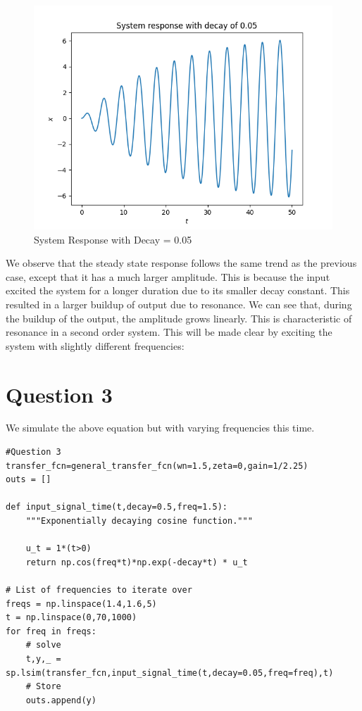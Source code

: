 \documentclass{article}
\begin{document}
\begin{figure}[tbh!]
\centering
\includegraphics[scale=0.6]{plots/System response with decay of 0.05.png}
\caption{System Response with Decay = 0.05}
\label{fig:System Response with Decay = 0.05}
\end{figure}
\newpage
We observe that the steady state response follows the same trend as the
previous case, except that it has a much larger amplitude. This is
because the input excited the system for a longer duration due to its
smaller decay constant. This resulted in a larger buildup of output due
to resonance. We can see that, during the buildup of the output, the
amplitude grows linearly. This is characteristic of resonance in a
second order system. This will be made clear by exciting the system with
slightly different frequencies:


\section*{Question 3}\label{Question 3}

We simulate the above equation but with varying frequencies this time.
\\

\begin{lstlisting}
#Question 3
transfer_fcn=general_transfer_fcn(wn=1.5,zeta=0,gain=1/2.25)
outs = []

def input_signal_time(t,decay=0.5,freq=1.5):
    """Exponentially decaying cosine function."""

    u_t = 1*(t>0)
    return np.cos(freq*t)*np.exp(-decay*t) * u_t

# List of frequencies to iterate over
freqs = np.linspace(1.4,1.6,5)
t = np.linspace(0,70,1000)
for freq in freqs:
    # solve
    t,y,_ = sp.lsim(transfer_fcn,input_signal_time(t,decay=0.05,freq=freq),t)
    # Store
    outs.append(y)

\end{lstlisting}
\end{document}
